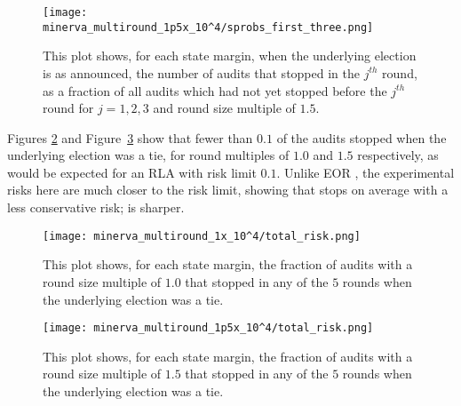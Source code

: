 \begin{figure}
\texttt{[image: minerva\_multiround\_1p5x\_10^4/sprobs\_first\_three.png]}
\caption{This plot shows, for each state margin, when the underlying election is as announced, the number of \Minerva audits that stopped in the $j^{th}$ round,
as a fraction of all \Minerva audits which had not yet stopped before the $j^{th}$ round for $j=1,2,3$ and round size multiple of $1.5$.}
\label{fig:minerva1p5_sprob}
\end{figure}

Figures \ref{fig:minerva1_risk} and Figure~\ref{fig:minerva1p5_risk} show that fewer than $0.1$ of the audits stopped when the underlying election was a tie, for round multiples of $1.0$ and $1.5$ respectively, as would be expected for an RLA with risk limit $0.1$. 
Unlike EOR \BRAVO, the experimental risks here are much closer to the risk limit,
showing that \Minerva stops on average with a less conservative risk; \Minerva is sharper.

\begin{figure}
\texttt{[image: minerva\_multiround\_1x\_10^4/total\_risk.png]}
\caption{This plot shows, for each state margin,
the fraction of \Minerva audits with a round size multiple of $1.0$ that stopped in any of the $5$ rounds when the underlying election was a tie.}
\label{fig:minerva1_risk}
\end{figure}




\begin{figure}
\texttt{[image: minerva\_multiround\_1p5x\_10^4/total\_risk.png]}
\caption{This plot shows, for each state margin,
the fraction of \Minerva audits with a round size multiple of $1.5$ that stopped in any of the $5$ rounds when the underlying election was a tie.}
\label{fig:minerva1p5_risk}
\end{figure}




